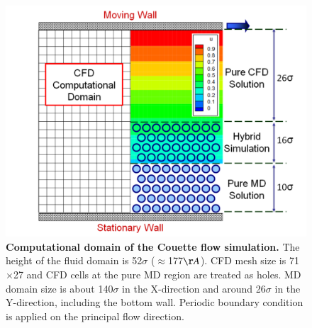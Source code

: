 \documentclass[preprint,12pt]{elsarticle}
\begin{document}
\begin{figure}
\centering
\includegraphics[width=0.8\linewidth]{Couette_Val_Domain.pdf}
\vskip-0.2cm
\caption{\small {\bf Computational domain of the Couette flow simulation.} The height of the fluid domain is 52$\sigma$ ($\approx$177$\AA$). CFD mesh size is 71$\times$27 and CFD cells at the pure MD region are treated as holes. MD domain size is about 140$\sigma$ in the X-direction and around 26$\sigma$ in the Y-direction, including the bottom wall. Periodic boundary condition is applied on the principal flow direction.}
\label{Couette_Val_Domain}
\end{figure}


\end{document}
